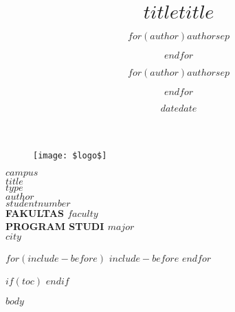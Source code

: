 \documentclass[a4,11pt]{$documentclass$}
\title{$title$}
\author{$for(author)$$author$$sep$ \and $endfor$}
\date{$date$}
\title{$title$}
\author{$for(author)$$author$$sep$ \and $endfor$}
\date{$date$}
\begin{document}
\begin{titlepage}
    \begin{center}
        \begin{figure}
            \begin{center}
                \texttt{[image: \$logo\$]}
            \end{center}
        \end{figure}
        \vspace*{0cm}
        \textbf{$campus$} \\
        \textbf{$title$} \\[1.0cm]
        \vspace*{2.5cm}
        \textbf{$type$} \\
        \vspace*{3 cm}       
        \textbf{$author$} \\
        \textbf{$studentnumber$} \\
        \vspace*{5.0cm}
        \textbf{
            FAKULTAS $faculty$ \\
            PROGRAM STUDI $major$ \\
            $city$
        }
    \end{center}
\end{titlepage}

$for(include-before)$
    $include-before$
$endfor$

$if(toc)$
{
    \hypersetup{linkcolor=black}
    \tableofcontents
}
$endif$

\newpage
{}

$body$
\end{document}
